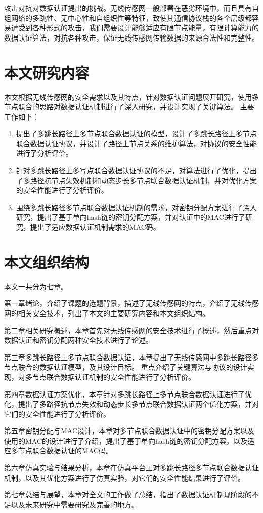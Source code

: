 攻击对抗对数据认证提出的挑战。无线传感网一般部署在恶劣环境中，而且具有自组网络的多跳性、无中心性和自组织性等特征，致使其通信协议栈的各个层级都容易遭受到各种形式的攻击，我们需要设计能够适应有限节点能量，有限计算能力的数据认证算法，对抗各种攻击，保证无线传感网传输数据的来源合法性和完整性。

\section{本文研究内容}
本文根据无线传感网的安全需求以及其特点，针对数据认证问题展开研究，使用多节点联合的思路对数据认证机制进行了深入研究，并设计实现了关键算法。
主要工作如下：

\begin{enumerate}\setlength{\itemsep}{-\itemsep}
  \item 提出了多跳长路径上多节点联合数据认证的模型，设计了多跳长路径上多节点联合数据认证协议，并设计了路径上节点关系的维护算法，对协议的安全性能进行了分析评价。
  \item 针对多跳长路径上多写点联合数据认证协议的不足，对算法进行了优化，提出了多路径抗节点失效机制和动态步长多节点联合数据认证机制，并对优化方案的安全性能进行了分析评价。
  \item 围绕多跳长路径多节点联合数据认证机制的需求，对密钥分配方案进行了深入研究，提出了基于单向hash链的密钥分配方案，并对认证中的MAC进行了研究，提出了适应数据认证机制需求的MAC码。
\end{enumerate}


\section{本文组织结构}
本文一共分为七章。

第一章\quad 绪论，介绍了课题的选题背景，描述了无线传感网的特点，介绍了无线传感网的相关安全技术，列出了本文的主要研究内容和本文组织结构。

第二章\quad 相关研究概述，本章首先对无线传感网的安全技术进行了概述，然后重点对数据认证和密钥分配两种安全技术进行了论述。

第三章\quad 多跳长路径上多节点联合数据认证，本章提出了无线传感网中多跳长路径多节点联合的数据认证模型，及其设计目标。
重点介绍了关键算法与协议的设计实现，对多节点联合数据认证机制的安全性能进行了分析评价。

第四章\quad 数据认证方案优化，本章针对多跳长路径上多节点联合数据认证进行了优化，提出了多路径抗节点失效和动态步长多节点联合数据认证两个优化方案，并对它们的安全性能进行了分析评价。

第五章\quad 密钥分配与MAC设计，本章对多节点联合数据认证中的密钥分配方案以及使用的MAC的设计进行了介绍，提出了基于单向hash链的密钥分配方案，以及适应多节点联合数据认证的MAC码。

第六章\quad 仿真实验与结果分析，本章在仿真平台上对多跳长路径多节点联合数据认证机制，以及其优化方案进行了仿真实验，对它们的安全性能结果进行了评价。

第七章\quad 总结与展望，本章对全文的工作做了总结，指出了数据认证机制现阶段的不足以及未来研究中需要研究及完善的地方。

